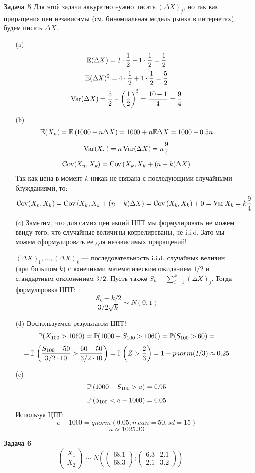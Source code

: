 \documentclass[12pt, a4paper]{article}\usepackage[]{graphicx}\usepackage[]{color}
\begin{document}
\begin{enumerate}
\item[\textbf{Задача 5}]
Для этой задачи аккуратно нужно писать \( \left(\Delta X \right)_j \), но так как приращения цен независимы (см. биномиальная модель рынка в интернетах) будем писать \( \Delta X \).
\begin{itemize}
\item[(a)] \[\E (\Delta X) = 2 \cdot \dfrac{1}{2} - 1 \cdot \dfrac{1}{2} = \dfrac{1}{2} \]
\[\E (\Delta X)^2 = 4 \cdot \dfrac{1}{2} + 1 \cdot \dfrac{1}{2} = \dfrac{5}{2} \]
\[\Var (\Delta X) = \dfrac{5}{2} - \left(\dfrac{1}{2}\right)^2 = \dfrac{10-1}{4}=\dfrac{9}{4} \]
\item[(b)] \[\E (X_n) = \E \left(1000 + n\Delta X \right)  = 1000 + n \E \Delta X = 1000 + 0.5 n     \]
\[ \Var (X_n) = n \Var (\Delta X) = n \dfrac{9}{4}  \]
\[ \Cov (X_n, X_k) = \Cov \left(X_k, X_k + (n-k) \Delta X \right)     \]
Так как цена в момент $k$ никак не связана с последующими случайными блужданиями, то:
\[ \Cov (X_n, X_k) = \Cov \left(X_k, X_k + (n-k) \Delta X \right) =  \Cov \left(X_k, X_k \right) + 0 = \Var X_k = k \dfrac{9}{4}    \]
\item[(c)] Заметим, что для самих цен акций ЦПТ мы формулировать не можем ввиду того, что случайные величины коррелированы, не i.i.d. Зато мы можем сформулировать ее для независимых приращений!

\( \left(\Delta X \right)_1, \ldots, \left(\Delta X \right)_{k} \) — последовательность i.i.d. случайных величин (при большом $k$) с конечными математическим ожиданием \(1/2 \) и стандартным отклонением \(3/2 \). Пусть также \( S_k = \sum_{i=1}^k \left(\Delta X \right)_j \). Тогда формулировка ЦПТ:
\[ \dfrac{S_k - k/2}{3/2 \sqrt{k}} \sim N(0,1)    \]
\item[(d)] Воспользуемся результатом ЦПТ!
\[\P(X_{100} > 1060) = \P (1000 + S_{100} > 1060) = \P(S_{100} >60) = \]
\[ = \P \left(\dfrac{S_{100} -50 }{3/2\cdot 10} > \dfrac{60-50}{3/2 \cdot 10}\right) = \P \left(Z > \dfrac{2}{3}\right) = 1-pnorm(2/3) \approx 0.25   \]

\item[(e)] \[ \P \left(1000 + S_{100} > a \right) = 0.95              \]
\[ \P \left( S_{100} < a-1000 \right) = 0.05              \]
Используя ЦПТ:
\[ a-1000 = qnorm(0.05, mean = 50, sd = 15 )            \]
\[ a \approx 1025.33   \]
\end{itemize}

\item[\textbf{Задача 6}]
\[\begin{pmatrix}
X_1 \\
X_2
\end{pmatrix} \sim N \left( \begin{pmatrix}
68.1 \\
68.3
\end{pmatrix} ; \begin{pmatrix}
6.3 & 2.1 \\
2.1 & 3.2
\end{pmatrix}                   \right)\]


\end{enumerate}
\end{document}
